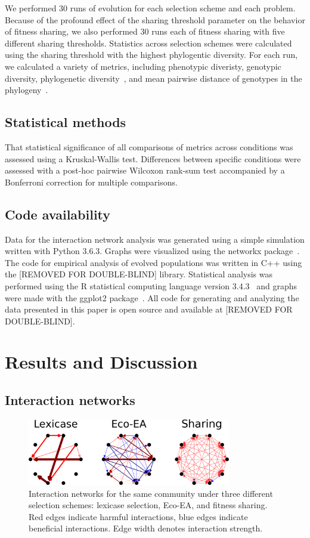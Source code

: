 We performed 30 runs of evolution for each selection scheme and each problem. Because of the profound effect of the sharing threshold parameter on the behavior of fitness sharing, we also performed 30 runs each of fitness sharing with five different sharing thresholds. Statistics across selection schemes were calculated using the sharing threshold with the highest phylogentic diversity. For each run, we calculated a variety of metrics, including phenotypic diveristy, genotypic diversity, phylogenetic diversity~\cite{faith_conservation_1992}, and mean pairwise distance of genotypes in the phylogeny~\cite{webb_exploring_2000}. 

\subsection{Statistical methods}
That statistical significance of all comparisons of metrics across conditions was assessed using a Kruskal-Wallis test. Differences between specific conditions were assessed with a post-hoc pairwise Wilcoxon rank-sum test accompanied by a Bonferroni correction for multiple comparisons.

\subsection{Code availability}
Data for the interaction network analysis was generated using a simple simulation written with Python 3.6.3. Graphs were visualized using the networkx package~\cite{hagberg_exploring_2008}. The code for empirical analysis of evolved populations was written in C++ using the [REMOVED FOR DOUBLE-BLIND] library. Statistical analysis was performed using the R statistical computing language version 3.4.3~\cite{r_core_team_r:_2017} and graphs were made with the ggplot2 package~\cite{wickham_ggplot2:_2009}. All code for generating and analyzing the data presented in this paper is open source and available at [REMOVED FOR DOUBLE-BLIND]. 

\section{Results and Discussion}

\subsection{Interaction networks}

\begin{figure}
\includegraphics[width=3.5in]{figs/interaction_networks.png}
\caption{Interaction networks for the same community under three different selection schemes: lexicase selection, Eco-EA, and fitness sharing. Red edges indicate harmful interactions, blue edges indicate beneficial interactions. Edge width denotes interaction strength.}
\label{interaction_network}
\end{figure}

